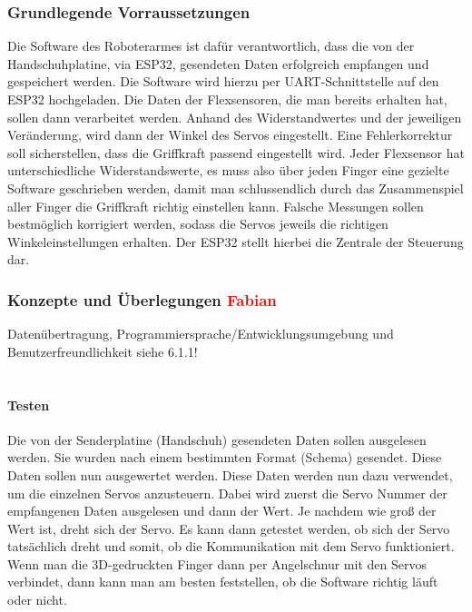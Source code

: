 \documentclass[titlepage,12pt,twoside]{article}
\begin{document}
\subsubsection{Grundlegende Vorraussetzungen}
Die Software des Roboterarmes ist dafür verantwortlich, dass die von der Handschuhplatine, via ESP32, gesendeten Daten 
erfolgreich empfangen und gespeichert werden. Die Software wird hierzu per UART-Schnittstelle auf den ESP32 hochgeladen. 
Die Daten der Flexsensoren, die man bereits erhalten hat, sollen dann verarbeitet werden. Anhand des Widerstandwertes und 
der jeweiligen Veränderung, wird dann der Winkel des Servos eingestellt. Eine Fehlerkorrektur soll sicherstellen, dass die 
Griffkraft passend eingestellt wird. Jeder Flexsensor hat unterschiedliche Widerstandswerte, es muss also über jeden Finger 
eine gezielte Software geschrieben werden, damit man schlussendlich durch das Zusammenspiel aller Finger die Griffkraft 
richtig einstellen kann. Falsche Messungen sollen bestmöglich korrigiert werden, sodass die Servos jeweils die richtigen 
Winkeleinstellungen erhalten. Der ESP32 stellt hierbei die Zentrale der Steuerung dar.

\subsubsection{Konzepte und Überlegungen \textcolor{red}{Fabian}}
Datenübertragung, Programmiersprache/Entwicklungsumgebung und Benutzerfreundlichkeit siehe 6.1.1! \\
\\
\paragraph{Testen}
\hfill \break
\hfill \break
Die von der Senderplatine (Handschuh) gesendeten Daten sollen ausgelesen werden. Sie wurden nach einem bestimmten Format 
(Schema) gesendet. Diese Daten sollen nun ausgewertet werden. Diese Daten werden nun dazu verwendet, um die einzelnen Servos 
anzusteuern. Dabei wird zuerst die Servo Nummer der empfangenen Daten ausgelesen und dann der Wert. Je nachdem wie groß der
Wert ist, dreht sich der Servo. Es kann dann getestet werden, ob sich der Servo tatsächlich dreht und somit, ob die 
Kommunikation mit dem Servo funktioniert. Wenn man die 3D-gedruckten Finger dann per Angelschnur mit den Servos verbindet, 
dann kann man am besten feststellen, ob die Software richtig läuft oder nicht. \\
\\
\end{document}
